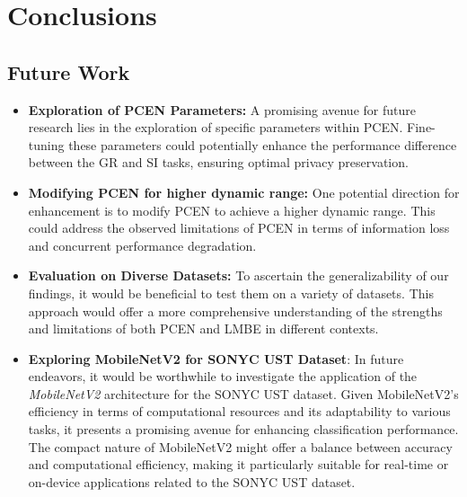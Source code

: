 \documentclass[
	a4paper 			%
	,12pt				%
	,titlepage
	,twoside
	,listof=totoc 		%
	,bibliography=totoc	%
	,numbers=noenddot 	%
	]{scrreprt}
\begin{document}
\newpage
\renewcommand{\thepage}{\arabic{page}}
\setcounter{page}{1}

% 
% 
% 
% 



\cleardoublepage





\cleardoublepage

\chapter*{Conclusions} 


\section*{Future Work}

\begin{itemize}
    \item \textbf{Exploration of PCEN Parameters:} A promising avenue for future research lies in the exploration of specific parameters within PCEN. Fine-tuning these parameters could potentially enhance the performance difference between the GR and SI tasks, ensuring optimal privacy preservation.
    \item \textbf{Modifying PCEN for higher dynamic range:} One potential direction for enhancement is to modify PCEN to achieve a higher dynamic range. This could address the observed limitations of PCEN in terms of information loss and concurrent performance degradation.
    \item \textbf{Evaluation on Diverse Datasets:} To ascertain the generalizability of our findings, it would be beneficial to test them on a variety of datasets. This approach would offer a more comprehensive understanding of the strengths and limitations of both PCEN and LMBE in different contexts.
    \item \textbf{Exploring MobileNetV2 for SONYC UST Dataset}: In future endeavors, it would be worthwhile to investigate the application of the \textit{MobileNetV2} architecture for the SONYC UST dataset. Given MobileNetV2's efficiency in terms of computational resources and its adaptability to various tasks, it presents a promising avenue for enhancing classification performance. The compact nature of MobileNetV2 might offer a balance between accuracy and computational efficiency, making it particularly suitable for real-time or on-device applications related to the SONYC UST dataset.
\end{itemize}
\end{document}
